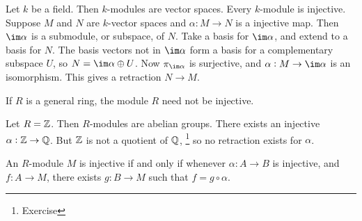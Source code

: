 \begin{example*}
Let $ k $ be a field. Then $ k $-modules are vector spaces. Every $ k $-module is injective. Suppose $ M $ and $ N $ are $ k $-vector spaces and $ \alpha : M \to N $ is a injective map. Then $ \im \alpha $ is a submodule, or subspace, of $ N $. Take a basis for $ \im \alpha $, and extend to a basis for $ N $. The basis vectors not in $ \im \alpha $ form a basis for a complementary subspace $ U $, so $ N = \im \alpha \oplus U $. Now $ \pi_{\im \alpha} $ is surjective, and $ \alpha : M \to \im \alpha $ is an isomorphism. This gives a retraction $ N \to M $.
\end{example*}

If $ R $ is a general ring, the module $ R $ need not be injective.

\begin{example*}
Let $ R = \mathbb{Z} $. Then $ R $-modules are abelian groups. There exists an injective $ \alpha : \mathbb{Z} \to \mathbb{Q} $. But $ \mathbb{Z} $ is not a quotient of $ \mathbb{Q} $, \footnote{Exercise} so no retraction exists for $ \alpha $.
\end{example*}

\begin{proposition}
An $ R $-module $ M $ is injective if and only if whenever $ \alpha : A \to B $ is injective, and $ f : A \to M $, there exists $ g : B \to M $ such that $ f = g \circ \alpha $.
\end{proposition}

